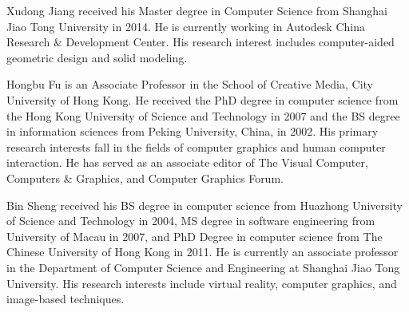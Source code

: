 \documentclass[10pt,journal,compsoc]{IEEEtran}
\begin{document}
\begin{IEEEbiography}{Xudong Jiang}
received his Master degree in Computer Science from Shanghai Jiao Tong University in 2014. He is currently working in Autodesk China Research \& Development Center. His research interest includes computer-aided geometric design and solid modeling.
\end{IEEEbiography}


\begin{IEEEbiography}{Hongbu Fu}
is an Associate Professor in the School of Creative Media, City University of Hong Kong. He received the PhD degree in computer science from the Hong Kong University of Science and Technology in 2007 and the BS degree in information sciences from Peking University, China, in 2002. His primary research interests fall in the fields of computer graphics and human computer interaction. He has served as an associate editor of The Visual Computer, Computers \& Graphics, and Computer Graphics Forum.
\end{IEEEbiography}


\begin{IEEEbiography}{Bin Sheng}
received his BS degree in computer science from Huazhong University of Science and Technology in 2004, MS degree in software engineering from University of Macau in 2007, and PhD Degree in computer science from The Chinese University of Hong Kong in 2011. He is currently an associate professor in the Department of Computer Science and Engineering at Shanghai Jiao Tong University. His research interests include virtual reality, computer graphics, and image-based techniques.
\end{IEEEbiography}
\end{document}
